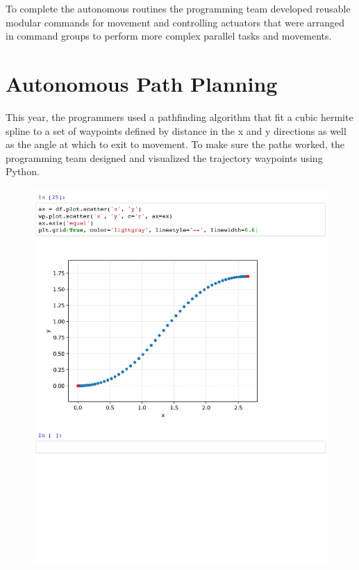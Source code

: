 \documentclass[10pt,tumble]{leaflet}
\begin{document}
To complete the autonomous routines the programming team developed reusable modular commands for movement and controlling actuators that were arranged in command groups to perform more complex parallel tasks and movements.

\section{Autonomous Path Planning}

This year, the programmers used a pathfinding algorithm that fit a cubic hermite spline to a set of waypoints defined by distance in the x and y directions as well as the angle at which to exit to movement.  To make sure the paths worked, the programming team designed and visualized the trajectory waypoints using Python.

\begin{figure}[H]
 \centering
 \includegraphics[scale=0.25]{assets/jupyter}
\end{figure}
\end{document}
